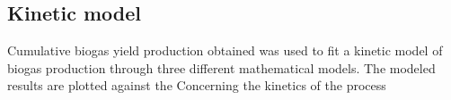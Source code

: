\subsection{Kinetic model}
Cumulative biogas yield production obtained was used to fit a kinetic model of biogas production through three different mathematical models. The modeled results are plotted against the
Concerning the kinetics of the process
